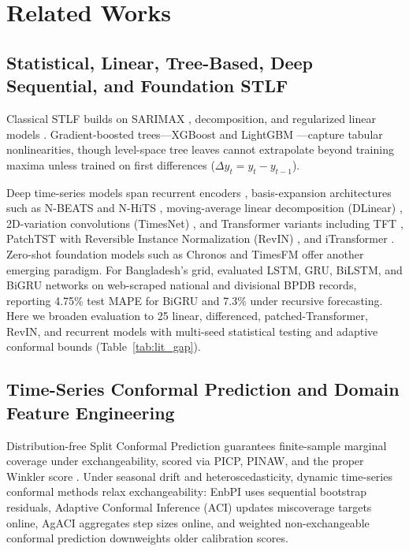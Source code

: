 \documentclass[5p,twocolumn,authoryear]{elsarticle}
\begin{document}
\section{Related Works}

\subsection{Statistical, Linear, Tree-Based, Deep Sequential, and Foundation STLF}
Classical STLF builds on SARIMAX \citep{box2015time}, decomposition, and regularized linear models \citep{hippert2001neural,almeshaiei2011decomposition,kuster2017electrical}. Gradient-boosted trees---XGBoost \citep{chen2016xgboost} and LightGBM \citep{ke2017lightgbm}---capture tabular nonlinearities, though level-space tree leaves cannot extrapolate beyond training maxima unless trained on first differences ($\Delta y_t = y_t - y_{t-1}$).

Deep time-series models span recurrent encoders \citep{hochreiter1997lstm,cho2014gru,schuster1997birnn,kong2019stlf,smyl2020hybrid,wang2019combining}, basis-expansion architectures such as N-BEATS \citep{oreshkin2020nbeats} and N-HiTS \citep{challu2023nhits}, moving-average linear decomposition (DLinear) \citep{zeng2023dlinear}, 2D-variation convolutions (TimesNet) \citep{wu2023timesnet}, and Transformer variants \citep{vaswani2017attention} including TFT \citep{lim2021tft}, PatchTST with Reversible Instance Normalization (RevIN) \citep{nie2023patchtst,kim2022revin}, and iTransformer \citep{liu2024itransformer,wen2023transformers}. Zero-shot foundation models such as Chronos \citep{ansari2024chronos} and TimesFM \citep{das2024timesfm} offer another emerging paradigm. For Bangladesh's grid, \citet{yeaser2025bangladesh} evaluated LSTM, GRU, BiLSTM, and BiGRU networks on web-scraped national and divisional BPDB records, reporting 4.75\% test MAPE for BiGRU and 7.3\% under recursive forecasting. Here we broaden evaluation to 25 linear, differenced, patched-Transformer, RevIN, and recurrent models with multi-seed statistical testing and adaptive conformal bounds (Table~\ref{tab:lit_gap}).

\subsection{Time-Series Conformal Prediction and Domain Feature Engineering}
Distribution-free Split Conformal Prediction \citep{lei2018conformal} guarantees finite-sample marginal coverage under exchangeability, scored via PICP, PINAW, and the proper Winkler score \citep{winkler1972decision}. Under seasonal drift and heteroscedasticity, dynamic time-series conformal methods relax exchangeability: EnbPI \citep{xu2021enbpi} uses sequential bootstrap residuals, Adaptive Conformal Inference (ACI) \citep{gibbs2021aci} updates miscoverage targets online, AgACI \citep{zaffran2022agaci} aggregates step sizes online, and weighted non-exchangeable conformal prediction \citep{barber2023nexcp} downweights older calibration scores.
\end{document}
